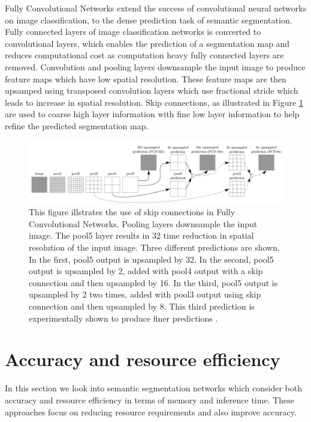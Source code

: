 Fully Convolutional Networks \cite{DBLP:journals/corr/LongSD14} extend the success of convolutional neural networks on image classification, to the dense prediction task of semantic segmentation. Fully connected layers of image classification networks is converted to convolutional layers, which enables the prediction of a segmentation map and reduces computational cost as computation heavy fully connected layers are removed. Convolution and pooling layers downsample the input image to produce feature maps which have low spatial resolution. These feature maps are then upsamped using transposed convolution layers which use fractional stride which leads to increase in spatial resolution. Skip connections, as illustrated in Figure \ref{Fig:fcn} are used to coarse high layer information with fine low layer information to help refine the predicted segmentation map. 

	\begin{figure}[h]
		\centering
		\includegraphics[width=1\linewidth]{images/fcn_skip}
		\caption{This figure illstrates the use of skip connections in Fully Convolutional Networks. Pooling layers downsample the input image. The pool5 layer results in 32 time reduction in spatial resolution of the input image. Three different predictions are shown. In the first, pool5 output is upsampled by 32. In the second, pool5 output is upsampled by 2, added with pool4 output with a skip connection and then upsampled by 16. In the third, pool5 output is upsampled by 2 two times, added with pool3 output using skip connection and then upsampled by 8. This third prediction is experimentally shown to produce finer predictions \cite{DBLP:journals/corr/LongSD14}.}
		\label{Fig:fcn}
	\end{figure}

\section{Accuracy and resource efficiency}
\label{section:acceff}

In this section we look into semantic segmentation networks which consider both accuracy and resource efficiency in terms of memory and inference time. These approaches focus on reducing resource requirements and also improve accuracy.

